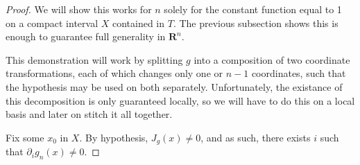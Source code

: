 \documentclass[11pt]{article}
\theoremstyle{definition}
\theoremstyle{plain}
\newcommand{\R}{\mathbf{R}}
\begin{document}
\begin{proof}
We will show this works for $n$ solely for the constant function equal to 1 on a compact interval $X$ contained in $T$. The previous subsection shows this is enough to guarantee full generality in $\R^n$.

This demonstration will work by splitting $g$ into a composition of two coordinate transformations, each of which changes only one or $n-1$ coordinates, such that the hypothesis may be used on both separately. Unfortunately, the existance of this decomposition is only guaranteed locally, so we will have to do this on a local basis and later on stitch it all together.

Fix some $x_0$ in $X$. By hypothesis, $J_g(x) \neq 0$, and as such, there exists $i$ such that $\partial_i g_n(x) \neq 0$.
\end{proof}
\end{document}
